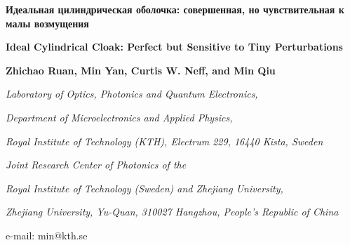 \documentclass[a4paper, 12pt]{article}
\newcommand{\tit}[1]{\begin{center}{\bf{\Large #1}}\end{center}}
\newcommand{\aut}[1]{\centerline{{\bf #1}}}
\newcommand{\cityorg}[1]{\centerline{\it #1}}
\newcommand{\email}[1]{\centerline{{\small e-mail: #1}}\vspace{\baselineskip}}
\begin{document}
\sloppy

 \tit{Идеальная цилиндрическая оболочка: совершенная, но чувствительная к малы возмущения}
 \tit{Ideal Cylindrical Cloak: Perfect but Sensitive to Tiny Perturbations}
 \aut{Zhichao Ruan, Min Yan, Curtis W. Neff, and Min Qiu}
 \cityorg{Laboratory of Optics, Photonics and Quantum Electronics,} 
 \cityorg{Department of Microelectronics and Applied Physics,} 
 \cityorg{Royal Institute of Technology (KTH), Electrum 229, 16440 Kista, Sweden}
 \cityorg{Joint Research Center of Photonics of the}
 \cityorg{Royal Institute of Technology (Sweden) and Zhejiang University,}
 \cityorg{Zhejiang University, Yu-Quan, 310027 Hangzhou, People’s Republic of China}
 \email{min@kth.se}

\begin{abstract}
\end{abstract}

\setcounter{secnumdepth}{5}



\begin{thebibliography}{99}
\end{thebibliography}
\end{document}
